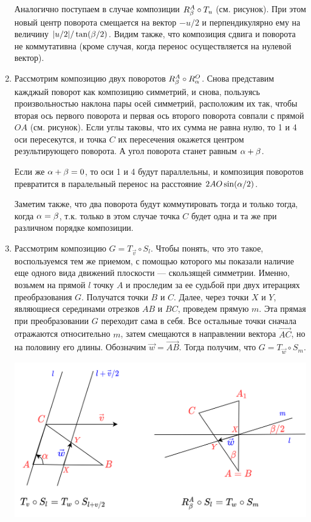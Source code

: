 \begin{enumerate}
Аналогично поступаем в случае композиции $R_\beta^A\circ T_u$ (см. рисунок). При этом новый центр поворота смещается на вектор $-u/2$ и перпендикулярно ему на величину $|u/2|/\tan(\beta/2)$. Видим также, что композиция сдвига и поворота не коммутативна (кроме случая, когда перенос осуществляется на нулевой вектор).

\item Рассмотрим композицию двух поворотов $R_\beta^A\circ R_\alpha^O$. Снова представим кажджый поворот как композицию симметрий, и снова, пользуясь произвольностью наклона пары осей симметрий, расположим их так, чтобы вторая ось первого поворота и первая ось второго поворота совпали с прямой $OA$ (см. рисунок). Если углы таковы, что их сумма не равна нулю, то 1 и 4 оси пересекутся, и точка $C$ их пересечения окажется центром результирующего поворота. А угол поворота станет равным $\alpha+\beta$.

Если же $\alpha+\beta=0$, то оси 1 и 4 будут параллельны, и композиция поворотов превратится в паралельный перенос на расстояние $2AO\sin(\alpha/2)$.

Заметим также, что два поворота будут коммутировать тогда и только тогда, когда $\alpha=\beta$, т.к. только в этом случае точка $C$ будет одна и та же при различном порядке композиции.

\item Рассмотрим композицию $G=T_{\vec v}\circ S_l$. Чтобы понять, что это такое, воспользуемся тем же приемом, с помощью которого мы показали наличие еще одного вида движений плоскости --- скользящей симметрии. Именно, возьмем на прямой $l$ точку $A$ и проследим за ее судьбой при двух итерациях преобразования $G$. Получатся точки $B$ и $C$. Далее, через точки $X$ и $Y$, являющиеся серединами отрезков $AB$ и $BC$, проведем прямую $m$. Эта прямая при преобразовании $G$ переходит сама в себя. Все остальные точки сначала отражаются относительно $m$, затем смещаются в направлении вектора $\vec{AC}$, но на половину его длины. Обозначим $\vec w=\vec{AB}$. Тогда получим, что $G=T_{\vec w}\circ S_m$.

\begin{center}
\includegraphics[scale=0.3]{slides.png}
\end{center}


\end{enumerate}

